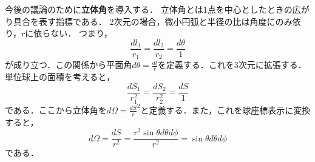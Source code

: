\documentclass{report}
\begin{document}
  今後の議論のために\textbf{立体角}を導入する．
  立体角とは1点を中心としたときの広がり具合を表す指標である．
  2次元の場合，微小円弧と半径の比は角度にのみ依り，$r$に依らない．
  つまり，
  \begin{equation}
    \frac{dl_1}{r_1}=\frac{dl_2}{r_2}=\frac{d\theta}{1}
  \end{equation}
  が成り立つ．この関係から平面角$d\theta=\frac{dl}{r}$を定義する．これを3次元に拡張する．単位球上の面積を考えると，
  \begin{equation}
    \frac{dS_1}{r_1^2}=\frac{dS_2}{r_2^2}=\frac{dS}{1}
  \end{equation}
  である．ここから立体角を$d\Omega=\frac{dS}r^2$と定義する．また，これを球座標表示に変換すると，
  \begin{equation}
    d\Omega = \frac{dS}{r^2} = \frac{r^2\sin\theta d\theta d\phi}{r^2} = \sin \theta d\theta d\phi
  \end{equation}
  である．
\end{document}

